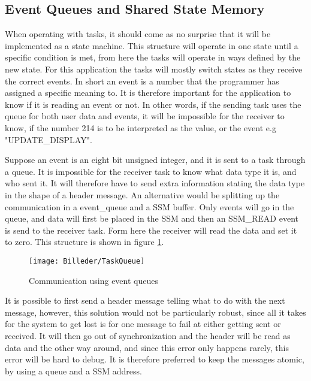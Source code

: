 \subsection{Event Queues and Shared State Memory}
\label{sec:EventQueuesandSharedStateMemory}

When operating with tasks, it should come as no surprise that it will be implemented as a state machine. This structure will operate in one state until a specific condition is met, from here the tasks will operate in ways defined by the new state. For this application the tasks will mostly switch states as they receive the correct events. In short an event is a number that the programmer has assigned a specific meaning to. It is therefore important for the application to know if it is reading an event or not. In other words, if the sending task uses the queue for both user data and events, it will be impossible for the receiver to know, if the number 214 is to be interpreted as the value, or the event e.g "UPDATE\_DISPLAY". 

Suppose an event is an eight bit unsigned integer, and it is sent to a task through a queue. It is impossible for the receiver task to know what data type it is, and who sent it. It will therefore have to send extra information stating the data type in the shape of a header message. 
An alternative would be splitting up the communication in a event\_queue and a SSM buffer. Only events will go in the queue, and data will first be placed in the SSM and then an SSM\_READ event is send to the receiver task. Form here the receiver will read the data and set it to zero. This structure is shown in figure \ref{fig:TaskQueue}.

\begin{figure}[h]
	\centering
	\texttt{[image: Billeder/TaskQueue]}
	\caption{Communication using event queues}
	\label{fig:TaskQueue}
\end{figure}

It is possible to first send a header message telling what to do with the next message, however, this solution would not be particularly robust, since all it takes for the system to get lost is for one message to fail at either getting sent or received. It will then go out of synchronization and the header will be read as data and the other way around, and since this error only happens rarely, this error will be hard to debug. It is therefore preferred to keep the messages atomic, by using a queue and a SSM address. 
 